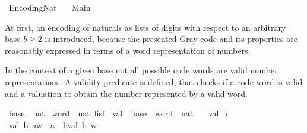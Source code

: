 %
\begin{isabellebody}%
%
%
\isadelimdocument
%
\endisadelimdocument
%
\isatagdocument
%
\isamarkuptrue%
%
\endisatagdocument
{\isafolddocument}%
%
\isadelimdocument
%
\endisadelimdocument
%
\isadelimtheory
%
\endisadelimtheory
%
\isatagtheory
{}\isamarkupfalse%
\ Encoding{\isacharunderscore}{\kern0pt}Nat\isanewline
\ \ \ Main\isanewline
{}%
\endisatagtheory
{\isafoldtheory}%
%
\isadelimtheory
%
\endisadelimtheory
%
\begin{isamarkuptext}%
At first, an encoding of naturals as lists of digits with respect to
  an arbitrary base $b \geq 2$ is introduced,
  because the presented Gray code and its properties
  are reasonably expressed in terms of a word representation of numbers.%
\end{isamarkuptext}\isamarkuptrue%
%
\isadelimdocument
%
\endisadelimdocument
%
\isatagdocument
%
\isamarkuptrue%
%
\endisatagdocument
{\isafolddocument}%
%
\isadelimdocument
%
\endisadelimdocument
%
\begin{isamarkuptext}%
In the context of a given base not all possible code words are valid
  number representations.
A validity predicate is defined, that checks if a code word is valid
  and a valuation to obtain the number represented by a valid word.%
\end{isamarkuptext}\isamarkuptrue%
\isamarkupfalse%
\ base\ {\isacharequal}{\kern0pt}\ nat\isanewline
\isanewline
{}\isamarkupfalse%
\ word\ {\isacharequal}{\kern0pt}\ {\isachardoublequoteopen}nat\ list{\isachardoublequoteclose}\isanewline
\isanewline
{}\isamarkupfalse%
\ val\ {\isacharcolon}{\kern0pt}{\isacharcolon}{\kern0pt}\ {\isachardoublequoteopen}base\ {\isasymRightarrow}\ word\ {\isasymRightarrow}\ nat{\isachardoublequoteclose}\ \isanewline
\ \ {\isachardoublequoteopen}val\ b\ {\isacharbrackleft}{\kern0pt}{\isacharbrackright}{\kern0pt}\ {\isacharequal}{\kern0pt}\ {}{\isachardoublequoteclose}\isanewline
{\isacharbar}{\kern0pt}\ {\isachardoublequoteopen}val\ b\ {\isacharparenleft}{\kern0pt}a{\isacharhash}{\kern0pt}w{\isacharparenright}{\kern0pt}\ {\isacharequal}{\kern0pt}\ a\ {\isacharplus}{\kern0pt}\ b{\isacharasterisk}{\kern0pt}val\ b\ w{\isachardoublequoteclose}\isanewline

\end{isabellebody}
